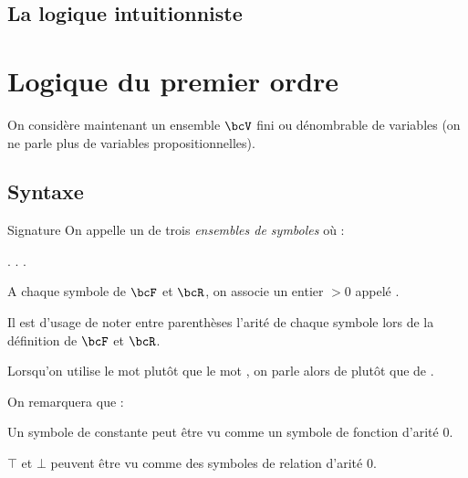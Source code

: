     \subsection{La logique intuitionniste}
    
    \section{Logique du premier ordre}
    
    On considère maintenant un ensemble $\bcV$ fini ou dénombrable de variables (on ne parle plus de variables propositionnelles).
    
    \subsection{Syntaxe}
    
    \begin{definition}{Signature}{}
        On appelle  un  de trois \textit{ensembles de symboles} où :
        \begin{enumerate}
            \itast {}.
            \itast {}.
            \itast {}.
        \end{enumerate}
        A chaque symbole de $\bcF$ et $\bcR$, on associe un entier $> 0$ appelé .
    \end{definition}
    
    Il est d'usage de noter entre parenthèses l'arité de chaque symbole lors de la définition de $\bcF$ et $\bcR$.
    
    Lorsqu'on utilise le mot  plutôt que le mot , on parle alors de  plutôt que de .
    
    On remarquera que :
    \begin{enumerate}
        \itt Un symbole de constante peut être vu comme un symbole de fonction d'arité $0$.
        
        \itt $\top$ et $\bot$ peuvent être vu comme des symboles de relation d'arité $0$.
    \end{enumerate}
    
